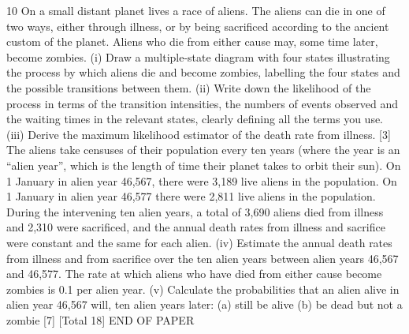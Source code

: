 


10 On a small distant planet lives a race of aliens. The aliens can die in one of two ways,
either through illness, or by being sacrificed according to the ancient custom of the
planet. Aliens who die from either cause may, some time later, become zombies.
(i) Draw a multiple-state diagram with four states illustrating the process by
which aliens die and become zombies, labelling the four states and the
possible transitions between them. 
(ii) Write down the likelihood of the process in terms of the transition intensities,
the numbers of events observed and the waiting times in the relevant states,
clearly defining all the terms you use. 
(iii) Derive the maximum likelihood estimator of the death rate from illness. [3]
The aliens take censuses of their population every ten years (where the year is an
“alien year”, which is the length of time their planet takes to orbit their sun). On
1 January in alien year 46,567, there were 3,189 live aliens in the population. On 1
January in alien year 46,577 there were 2,811 live aliens in the population. During
the intervening ten alien years, a total of 3,690 aliens died from illness and 2,310 were
sacrificed, and the annual death rates from illness and sacrifice were constant and the
same for each alien.
(iv) Estimate the annual death rates from illness and from sacrifice over the ten
alien years between alien years 46,567 and 46,577. 
The rate at which aliens who have died from either cause become zombies is 0.1 per
alien year.
(v) Calculate the probabilities that an alien alive in alien year 46,567 will, ten
alien years later:
(a) still be alive
(b) be dead but not a zombie
[7]
[Total 18]
END OF PAPER


